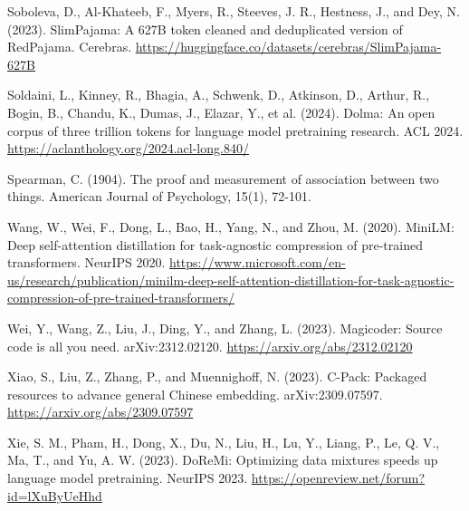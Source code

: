 \documentclass[11pt]{article}
\begin{document}
Soboleva, D., Al-Khateeb, F., Myers, R., Steeves, J. R., Hestness, J., and Dey, N. (2023). SlimPajama: A 627B token cleaned and deduplicated version of RedPajama. Cerebras. \url{https://huggingface.co/datasets/cerebras/SlimPajama-627B}

Soldaini, L., Kinney, R., Bhagia, A., Schwenk, D., Atkinson, D., Arthur, R., Bogin, B., Chandu, K., Dumas, J., Elazar, Y., et al. (2024). Dolma: An open corpus of three trillion tokens for language model pretraining research. ACL 2024. \url{https://aclanthology.org/2024.acl-long.840/}

Spearman, C. (1904). The proof and measurement of association between two things. American Journal of Psychology, 15(1), 72-101.

Wang, W., Wei, F., Dong, L., Bao, H., Yang, N., and Zhou, M. (2020). MiniLM: Deep self-attention distillation for task-agnostic compression of pre-trained transformers. NeurIPS 2020. \url{https://www.microsoft.com/en-us/research/publication/minilm-deep-self-attention-distillation-for-task-agnostic-compression-of-pre-trained-transformers/}

Wei, Y., Wang, Z., Liu, J., Ding, Y., and Zhang, L. (2023). Magicoder: Source code is all you need. arXiv:2312.02120. \url{https://arxiv.org/abs/2312.02120}

Xiao, S., Liu, Z., Zhang, P., and Muennighoff, N. (2023). C-Pack: Packaged resources to advance general Chinese embedding. arXiv:2309.07597. \url{https://arxiv.org/abs/2309.07597}

Xie, S. M., Pham, H., Dong, X., Du, N., Liu, H., Lu, Y., Liang, P., Le, Q. V., Ma, T., and Yu, A. W. (2023). DoReMi: Optimizing data mixtures speeds up language model pretraining. NeurIPS 2023. \url{https://openreview.net/forum?id=lXuByUeHhd}
\end{document}
